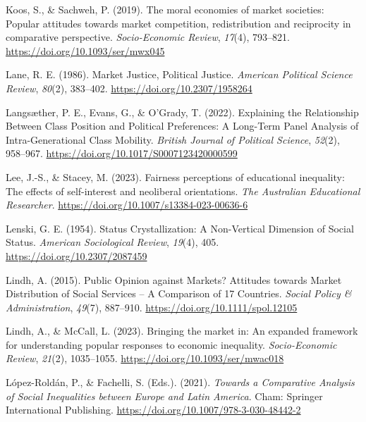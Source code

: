 \documentclass[
  13pt,
]{article}
\newlength{\cslhangindent}
\newenvironment{CSLReferences}[2] %
 {\begin{list}{}{%
  \setlength{\itemindent}{0pt}
  \setlength{\leftmargin}{0pt}
  \setlength{\parsep}{0pt}
  \ifodd #1
   \setlength{\leftmargin}{\cslhangindent}
   \setlength{\itemindent}{-1\cslhangindent}
  \fi
  \setlength{\itemsep}{#2\baselineskip}}}
 {\end{list}}
\begin{document}
\begin{CSLReferences}{1}{0}
Koos, S., \& Sachweh, P. (2019). The moral economies of market
societies: Popular attitudes towards market competition, redistribution
and reciprocity in comparative perspective. \emph{Socio-Economic
Review}, \emph{17}(4), 793--821.
\url{https://doi.org/10.1093/ser/mwx045}

Lane, R. E. (1986). Market {Justice}, {Political Justice}.
\emph{American Political Science Review}, \emph{80}(2), 383--402.
\url{https://doi.org/10.2307/1958264}

Langsæther, P. E., Evans, G., \& O'Grady, T. (2022). Explaining the
{Relationship Between Class Position} and {Political Preferences}: {A
Long-Term Panel Analysis} of {Intra-Generational Class Mobility}.
\emph{British Journal of Political Science}, \emph{52}(2), 958--967.
\url{https://doi.org/10.1017/S0007123420000599}

Lee, J.-S., \& Stacey, M. (2023). Fairness perceptions of educational
inequality: The effects of self-interest and neoliberal orientations.
\emph{The Australian Educational Researcher}.
\url{https://doi.org/10.1007/s13384-023-00636-6}

Lenski, G. E. (1954). Status {Crystallization}: {A Non-Vertical
Dimension} of {Social Status}. \emph{American Sociological Review},
\emph{19}(4), 405. \url{https://doi.org/10.2307/2087459}

Lindh, A. (2015). Public {Opinion} against {Markets}? {Attitudes}
towards {Market Distribution} of {Social Services} -- {A Comparison} of
17 {Countries}. \emph{Social Policy \& Administration}, \emph{49}(7),
887--910. \url{https://doi.org/10.1111/spol.12105}

Lindh, A., \& McCall, L. (2023). Bringing the market in: An expanded
framework for understanding popular responses to economic inequality.
\emph{Socio-Economic Review}, \emph{21}(2), 1035--1055.
\url{https://doi.org/10.1093/ser/mwac018}

López-Roldán, P., \& Fachelli, S. (Eds.). (2021). \emph{Towards a
{Comparative Analysis} of {Social Inequalities} between {Europe} and
{Latin America}}. Cham: Springer International Publishing.
\url{https://doi.org/10.1007/978-3-030-48442-2}


\end{CSLReferences}
\end{document}
